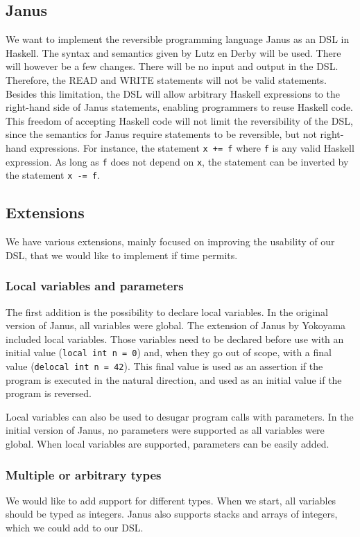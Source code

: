 \documentclass[12pt,a4paper]{article}
\newcommand{\code}[1]{\texttt{#1}}
\begin{document}
	\subsection{Janus}
	We want to implement the reversible programming language Janus as an DSL in Haskell. The syntax and semantics given by Lutz en Derby \cite{lutz82} will be used. There will however be a few changes. There will be no input and output in the DSL. Therefore, the READ and WRITE statements will not be valid statements. Besides this limitation, the DSL will allow arbitrary Haskell expressions to the right-hand side of Janus statements, enabling programmers to reuse Haskell code. This freedom of accepting Haskell code will not limit the reversibility of the DSL, since the semantics for Janus require statements to be reversible, but not right-hand expressions. For instance, the statement \code{x += f} where \code{f} is any valid Haskell expression. As long as \code{f} does not depend on \code{x}, the statement can be inverted by the statement \code{x -= f}.
	
	\subsection{Extensions}
	We have various extensions, mainly focused on improving the usability of our DSL, that we would like to implement if time permits.
	
	\subsubsection{Local variables and parameters}
	The first addition is the possibility to declare local variables. In the original version of Janus\cite{lutz82}, all variables were global. The extension of Janus by Yokoyama\cite{yokoyama10} included local variables. Those variables need to be declared before use with an initial value (\texttt{local int n = 0}) and, when they go out of scope, with a final value (\texttt{delocal int n = 42}). This final value is used as an assertion if the program is executed in the natural direction, and used as an initial value if the program is reversed.
	
	Local variables can also be used to desugar program calls with parameters. In the initial version of Janus\cite{lutz82}, no parameters were supported as all variables were global. When local variables are supported, parameters can be easily added.
	
	\subsubsection{Multiple or arbitrary types}
	We would like to add support for different types. When we start, all variables should be typed as integers. Janus also supports stacks and arrays of integers, which we could add to our DSL.
	
\end{document}
